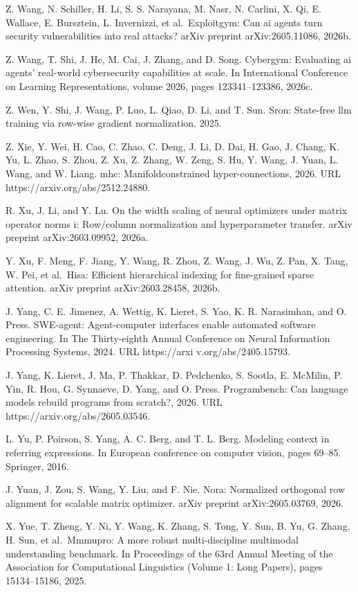 Z. Wang, N. Schiller, H. Li, S. S. Narayana, M. Nasr, N. Carlini, X. Qi,
E. Wallace, E. Bursztein, L. Invernizzi, et al.~Exploitgym: Can ai
agents turn security vulnerabilities into real attacks? arXiv preprint
arXiv:2605.11086, 2026b.

Z. Wang, T. Shi, J. He, M. Cai, J. Zhang, and D. Song. Cybergym:
Evaluating ai agents' real-world cybersecurity capabilities at scale. In
International Conference on Learning Representations, volume 2026, pages
123341--123386, 2026c.

Z. Wen, Y. Shi, J. Wang, P. Luo, L. Qiao, D. Li, and T. Sun. Sron:
State-free llm training via row-wise gradient normalization. 2025.

Z. Xie, Y. Wei, H. Cao, C. Zhao, C. Deng, J. Li, D. Dai, H. Gao, J.
Chang, K. Yu, L. Zhao, S. Zhou, Z. Xu, Z. Zhang, W. Zeng, S. Hu, Y.
Wang, J. Yuan, L. Wang, and W. Liang. mhc: Manifoldconstrained
hyper-connections, 2026. URL https://arxiv.org/abs/2512.24880.

R. Xu, J. Li, and Y. Lu. On the width scaling of neural optimizers under
matrix operator norms i: Row/column normalization and hyperparameter
transfer. arXiv preprint arXiv:2603.09952, 2026a.



Y. Xu, F. Meng, F. Jiang, Y. Wang, R. Zhou, Z. Wang, J. Wu, Z. Pan, X.
Tang, W. Pei, et al.~Hisa: Efficient hierarchical indexing for
fine-grained sparse attention. arXiv preprint arXiv:2603.28458, 2026b.

J. Yang, C. E. Jimenez, A. Wettig, K. Lieret, S. Yao, K. R. Narasimhan,
and O. Press. SWE-agent: Agent-computer interfaces enable automated
software engineering. In The Thirty-eighth Annual Conference on Neural
Information Processing Systems, 2024. URL https://arxi
v.org/abs/2405.15793.

J. Yang, K. Lieret, J. Ma, P. Thakkar, D. Pedchenko, S. Sootla, E.
McMilin, P. Yin, R. Hou, G. Synnaeve, D. Yang, and O. Press.
Programbench: Can language models rebuild programs from scratch?, 2026.
URL https://arxiv.org/abs/2605.03546.

L. Yu, P. Poirson, S. Yang, A. C. Berg, and T. L. Berg. Modeling context
in referring expressions. In European conference on computer vision,
pages 69--85. Springer, 2016.

J. Yuan, J. Zou, S. Wang, Y. Liu, and F. Nie. Nora: Normalized
orthogonal row alignment for scalable matrix optimizer. arXiv preprint
arXiv:2605.03769, 2026.

X. Yue, T. Zheng, Y. Ni, Y. Wang, K. Zhang, S. Tong, Y. Sun, B. Yu, G.
Zhang, H. Sun, et al.~Mmmupro: A more robust multi-discipline multimodal
understanding benchmark. In Proceedings of the 63rd Annual Meeting of
the Association for Computational Linguistics (Volume 1: Long Papers),
pages 15134--15186, 2025.


